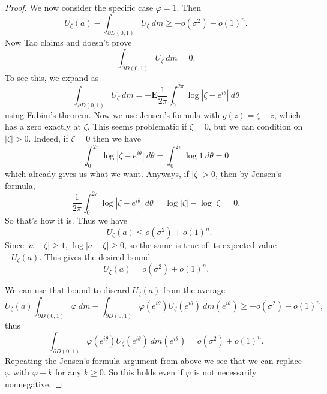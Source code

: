 \documentclass[12pt]{article}
\begin{document}
\begin{proof}
We now consider the specific case $\varphi = 1$. Then
$$U_\zeta(a) - \int_{\partial D(0, 1)} U_\zeta ~dm \geq -o(\sigma^2) - o(1)^n.$$
Now Tao claims and doesn't prove
$$\int_{\partial D(0, 1)} U_\zeta ~dm = 0.$$
To see this, we expand as
$$\int_{\partial D(0, 1)} U_\zeta ~dm = -\mathbf E \frac{1}{2\pi} \int_0^{2\pi} \log|\zeta - e^{i\theta}| ~d\theta$$
using Fubini's theorem. Now we use Jensen's formula with $g(z) = \zeta - z$, which has a zero exactly at $\zeta$.
This seems problematic if $\zeta = 0$, but we can condition on $|\zeta| > 0$. Indeed, if $\zeta = 0$ then we have
$$ \int_0^{2\pi} \log|\zeta - e^{i\theta}| ~d\theta = \int_0^{2\pi} \log 1 ~d\theta = 0$$
which already gives us what we want. Anyways, if $|\zeta| > 0$, then by Jensen's formula,
$$\frac{1}{2\pi} \int_0^{2\pi} \log|\zeta - e^{i\theta}| ~d\theta = \log |\zeta| - \log |\zeta| = 0.$$
So that's how it is.
Thus we have
$$-U_\zeta(a) \leq o(\sigma^2) + o(1)^n.$$
Since $|a - \zeta| \geq 1$, $\log |a - \zeta| \geq 0$, so the same is true of its expected value $-U_\zeta(a)$.
This gives the desired bound
$$U_\zeta(a) = o(\sigma^2) + o(1)^n.$$

We can use that bound to discard $U_\zeta(a)$ from the average
$$ U_\zeta(a)\int_{\partial D(0, 1)} \varphi ~dm - \int_{\partial D(0, 1)} \varphi(e^{i\theta}) U_\zeta(e^{i\theta}) ~dm(e^{i\theta}) \geq - o(\sigma^2) - o(1)^n,$$
thus
$$\int_{\partial D(0, 1)} \varphi(e^{i\theta}) U_\zeta(e^{i\theta}) ~dm(e^{i\theta})= o(\sigma^2) + o(1)^n.$$
Repeating the Jensen's formula argument from above we see that we can replace $\varphi$ with $\varphi - k$ for any $k \geq 0$.
So this holds even if $\varphi$ is not necessarily nonnegative.
\end{proof}
\end{document}
